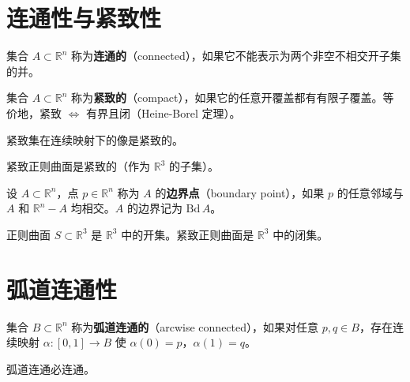 \begin{Remark}
\section{连通性与紧致性}

\begin{Definition}\label{def:connected}
集合 $A \subset \mathbb{R}^n$ 称为\textbf{连通的}（connected），如果它不能表示为两个非空不相交开子集的并。
\end{Definition}

\begin{Definition}\label{def:compact}
集合 $A \subset \mathbb{R}^n$ 称为\textbf{紧致的}（compact），如果它的任意开覆盖都有有限子覆盖。等价地，紧致 $\Leftrightarrow$ 有界且闭（Heine-Borel 定理）。
\end{Definition}

\begin{Proposition}\label{prop:continuous-image-compact}
紧致集在连续映射下的像是紧致的。
\end{Proposition}

\begin{Corollary}\label{coro:compact-surface}
紧致正则曲面是紧致的（作为 $\mathbb{R}^3$ 的子集）。
\end{Corollary}

\begin{Definition}\label{def:boundary}
设 $A \subset \mathbb{R}^n$，点 $p \in \mathbb{R}^n$ 称为 $A$ 的\textbf{边界点}（boundary point），如果 $p$ 的任意邻域与 $A$ 和 $\mathbb{R}^n - A$ 均相交。$A$ 的边界记为 $\mathrm{Bd}\,A$。
\end{Definition}

\begin{Proposition}\label{prop:open-closed}
正则曲面 $S \subset \mathbb{R}^3$ 是 $\mathbb{R}^3$ 中的开集。紧致正则曲面是 $\mathbb{R}^3$ 中的闭集。
\end{Proposition}

\section{弧道连通性}

\begin{Definition}\label{def:arcwise-connected}
集合 $B \subset \mathbb{R}^n$ 称为\textbf{弧道连通的}（arcwise connected），如果对任意 $p,q \in B$，存在连续映射 $\alpha: [0,1] \to B$ 使 $\alpha(0)=p$，$\alpha(1)=q$。
\end{Definition}

\begin{Proposition}\label{prop:arcwise-implies-connected}
弧道连通必连通。
\end{Proposition}


\end{Remark}
